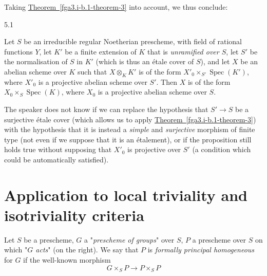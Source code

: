   Taking \hyperref[fga3.i-b.1-theorem-3]{Theorem~\ref*{fga3.i-b.1-theorem-3}} into account, we thus conclude:\begin{proposition}{5.1}\label{fga3.i-b.5-proposition-5.1}\skipsinglepar\par{}Let \(S\) be an irreducible regular Noetherian prescheme, with field of rational functions \(Y\), let \(K'\) be a finite extension of \(K\) that is \emph{unramified over \(S\)}, let \(S'\) be the normalisation of \(S\) in \(K'\) (which is thus an étale cover of \(S\)), and let \(X\) be an abelian scheme over \(K\) such that \(X\otimes _K K'\) is of the form \(X'_0\times _{S'}\operatorname {Spec}(K')\), where \(X'_0\) is a projective abelian scheme over \(S'\).
    Then \(X\) is of the form \(X_0\times _S\operatorname {Spec}(K)\), where \(X_0\) is a projective abelian scheme over \(S\).\end{proposition}\begin{remark}{}\label{fga3.i-b.5-remark}\skipsinglepar\par{}The speaker does not know if we can replace the hypothesis that \(S'\to  S\) be a surjective étale cover (which allows us to apply \hyperref[fga3.i-b.1-theorem-3]{Theorem~\ref*{fga3.i-b.1-theorem-3}}) with the hypothesis that it is instead a \emph{simple} and \emph{surjective} morphism of finite type (not even if we suppose that it is an étalement), or if the proposition still holds true without supposing that \(X'_0\) is projective over \(S'\) (a condition which could be automatically satisfied).\end{remark}\section{Application to local triviality and isotriviality criteria}\label{fga3.i-b.6}\par{}Let \(S\) be a prescheme, \(G\) a "\emph{prescheme of groups}" over \(S\), \(P\) a prescheme over \(S\) on which "\emph{\(G\) acts}" (on the right).
  We say that \(P\) is \emph{formally principal homogeneous} for \(G\) if the well-known morphism
  \[     G\times _S P \to  P\times _S P   \]
  
